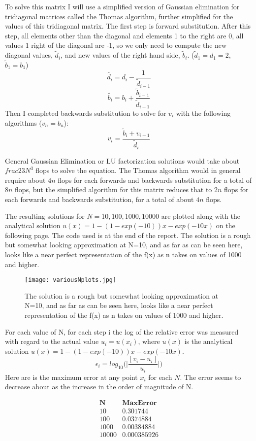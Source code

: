 \documentclass[11pt]{article}
\begin{document}
To solve this matrix I will use a simplified version of Gaussian elimination for tridiagonal matrices called the Thomas algorithm, further simplified for the values of this tridiagonal matrix. The first step is forward substitution. After this step, all elements other than the diagonal and elements 1 to the right are 0, all values 1 right of the diagonal are -1, so we only need to compute the new diagonal values, $\tilde{d}_i$, and new values of the right hand side, $\tilde{b}_i$. ($\tilde{d}_1=d_1=2$, $\tilde{b}_1=b_1$)
$$\tilde{d_i} = d_i - \frac{1}{\tilde{d}_{i-1}}$$
$$\tilde{b_i} = b_i + \frac{\tilde{b}_{i-1}}{\tilde{d}_{i-1}}$$
Then I completed backwards substitution to solve for $v_i$ with the following algorithms ($v_n=\tilde{b}_n$):
$$v_i=\frac{\tilde{b}_i+v_{i+1}}{\tilde{d}_i}$$

General Gaussian Elimination or LU factorization solutions would take about $frac{2}{3}N^3$ flops to solve the equation. The Thomas algorithm would in general require about $4n$ flops for each forwards and backwards substitution for a total of $8n$ flops, but the simplified algorithm for this matrix reduces that to $2n$ flops for each forwards and backwards substitution, for a total of about $4n$ flops.

The resulting solutions for $N=10,100,1000,10000$ are plotted along with the analytical solution $u(x)=1-(1-exp(-10))x-exp(-10x)$ on the following page. The code used is at the end of the report. The solution is a rough but somewhat looking approximation at N=10, and as far as can be seen here, looks like a near perfect representation of the f(x) as n takes on values of 1000 and higher.

\begin{figure}
	\texttt{[image: variousNplots.jpg]}
	\caption{The solution is a rough but somewhat looking approximation at N=10, and as far as can be seen here, looks like a near perfect representation of the f(x) as n takes on values of 1000 and higher.}
\end{figure}

For each value of N, for each step i the log of the relative error was measured with regard to the actual value $u_i=u(x_i)$, where $u(x)$ is the analytical solution $u(x)=1-(1-exp(-10))x-exp(-10x)$.
$$\epsilon_i=log_{10}\bigg(\bigg|\frac{[v_i-u_i]}{u_i}\bigg|\bigg)$$
Here are is the maximum error at any point $x_i$ for each $N$. The error seems to decrease about as the increase in the order of magnitude of N.

$$
\begin{matrix}
\mathbf{N} & \mathbf{Max Error}\\
10 & 0.301744\\
100 & 0.0374884\\
1000 & 0.00384884\\
10000 & 0.000385926
\end{matrix}
$$
\end{document}
